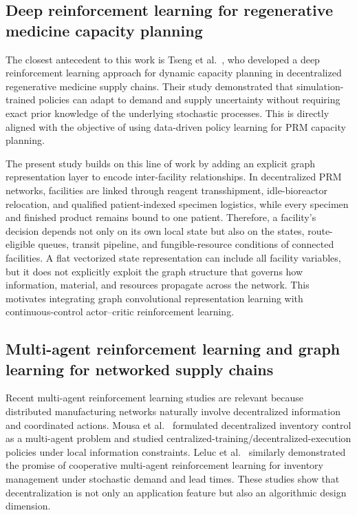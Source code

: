 \documentclass[preprint,review,12pt]{elsarticle}
\begin{document}
\subsection{Deep reinforcement learning for regenerative medicine capacity planning}
The closest antecedent to this work is Tseng et al.~\cite{Tseng2023DeepRL}, who developed a deep reinforcement learning approach for dynamic capacity planning in decentralized regenerative medicine supply chains. Their study demonstrated that simulation-trained policies can adapt to demand and supply uncertainty without requiring exact prior knowledge of the underlying stochastic processes. This is directly aligned with the objective of using data-driven policy learning for PRM capacity planning.

The present study builds on this line of work by adding an explicit graph representation layer to encode inter-facility relationships. In decentralized PRM networks, facilities are linked through reagent transshipment, idle-bioreactor relocation, and qualified patient-indexed specimen logistics, while every specimen and finished product remains bound to one patient. Therefore, a facility's decision depends not only on its own local state but also on the states, route-eligible queues, transit pipeline, and fungible-resource conditions of connected facilities. A flat vectorized state representation can include all facility variables, but it does not explicitly exploit the graph structure that governs how information, material, and resources propagate across the network. This motivates integrating graph convolutional representation learning with continuous-control actor--critic reinforcement learning.

\subsection{Multi-agent reinforcement learning and graph learning for networked supply chains}
Recent multi-agent reinforcement learning studies are relevant because distributed manufacturing networks naturally involve decentralized information and coordinated actions. Mousa et al.~\cite{Mousa2023DecInvMARL} formulated decentralized inventory control as a multi-agent problem and studied centralized-training/decentralized-execution policies under local information constraints. Leluc et al.~\cite{Leluc2023MARLIM} similarly demonstrated the promise of cooperative multi-agent reinforcement learning for inventory management under stochastic demand and lead times. These studies show that decentralization is not only an application feature but also an algorithmic design dimension.
\end{document}
